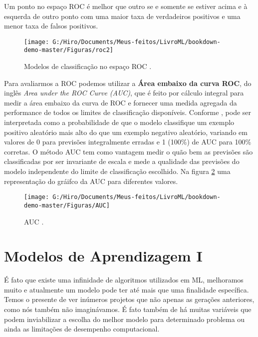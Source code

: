 \documentclass[
  openany]{book}
\begin{document}
Um ponto no espaço ROC é melhor que outro se e somente se estiver acima e à esquerda de outro ponto com uma maior taxa de verdadeiros positivos e uma menor taxa de falsos positivos.

\begin{figure}

{\centering \texttt{[image: G:/Hiro/Documents/Meus-feitos/LivroML/bookdown-demo-master/Figuras/roc2]} 

}

\caption{Modelos de classificação no espaço ROC \citep{prati2008curvas}.}\label{fig:roc2}
\end{figure}



Para avaliarmos a ROC podemos utilizar a \textbf{Área embaixo da curva ROC}, do inglês \emph{Area under the ROC Curve (AUC)}, que é feito por cálculo integral para medir a área embaixo da curva de ROC e fornecer uma medida agregada da performance de todos os limites de classificação disponíveis. Conforme \citep{mcclish1989}, pode ser interpretada como a probabilidade de que o modelo classifique um exemplo positivo aleatório mais alto do que um exemplo negativo aleatório, variando em valores de 0 para previsões integralmente erradas e 1 (100\%) de AUC para 100\% corretas. O método AUC tem como vantagem medir o quão bem as previsões são classificadas por ser invariante de escala e mede a qualidade das previsões do modelo independente do limite de classificação escolhido. Na figura \ref{fig:AUC} uma representação do gráifco da AUC para diferentes valores.

\begin{figure}

{\centering \texttt{[image: G:/Hiro/Documents/Meus-feitos/LivroML/bookdown-demo-master/Figuras/AUC]} 

}

\caption{AUC \citep{stephanieauc}.}\label{fig:AUC}
\end{figure}



\hypertarget{Algoritmosaprendizagem}{%
\chapter{Modelos de Aprendizagem I}\label{Algoritmosaprendizagem}}

É fato que existe uma infinidade de algoritmos utilizados em ML, melhoramos muito e atualmente um modelo pode ter até mais que uma finalidade específica. Temos o presente de ver inúmeros projetos que não apenas as gerações anteriores, como nós também não imaginávamos. É fato também de há muitas variáveis que podem inviabilizar a escolha do melhor modelo para determinado problema ou ainda as limitações de desempenho computacional.
\end{document}
